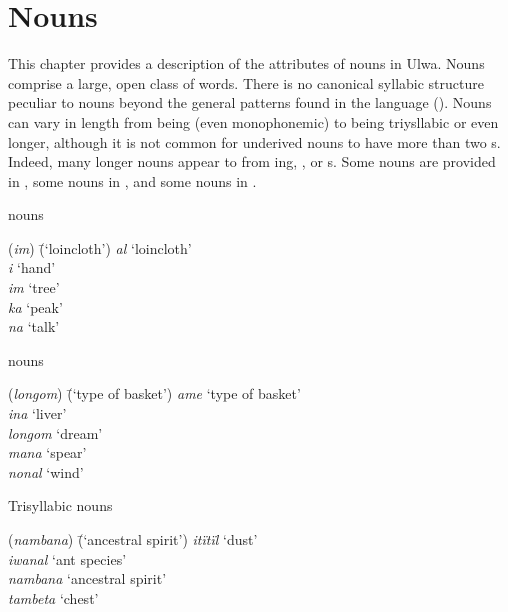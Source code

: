 \chapter{Nouns}\label{sec:3}


This chapter provides a description of the  attributes of nouns in Ulwa. Nouns comprise a large, open class of words. There is no canonical syllabic structure peculiar to nouns beyond the general patterns found in the language (). Nouns can vary in length from being  (even monophonemic) to being triysllabic or even longer, although it is not common for underived nouns to have more than two s. Indeed, many longer nouns appear to  from ing, , or s. Some  nouns are provided in , some  nouns in , and some  nouns in .

\ea%
    \label{ex:nouns:1}
             nouns\\
\begin{tabbing}
{(\textit{im})} \= {(‘loincloth’)}\kill
{\textit{al}} \> {‘loincloth’}\\
{\textit{i}} \> {‘hand’}\\
{\textit{im}} \> {‘tree’}\\
{\textit{ka}} \> {‘peak’}\\
{\textit{na}} \> {‘talk’}
\end{tabbing}
\z

\ea%
    \label{ex:nouns:2}
             nouns\\
\begin{tabbing}
{(\textit{longom})} \= {(‘type of basket’)}\kill
{\textit{ame}} \> {‘type of basket’}\\
{\textit{ina}} \> {‘liver’}\\
{\textit{longom}} \> {‘dream’}\\
{\textit{mana}} \> {‘spear’}\\
{\textit{nonal}} \> {‘wind’}
\end{tabbing}
\z

\ea%
    \label{ex:nouns:3}
            Trisyllabic nouns\\
\begin{tabbing}
{(\textit{nambana})} \= {(‘ancestral spirit’)}\kill
{\textit{itïtïl}} \> {‘dust’}\\
{\textit{iwanal}} \> {‘ant species’}\\
{\textit{nambana}} \> {‘ancestral spirit’}\\
{\textit{tambeta}} \> {‘chest’}
\end{tabbing}
\z

